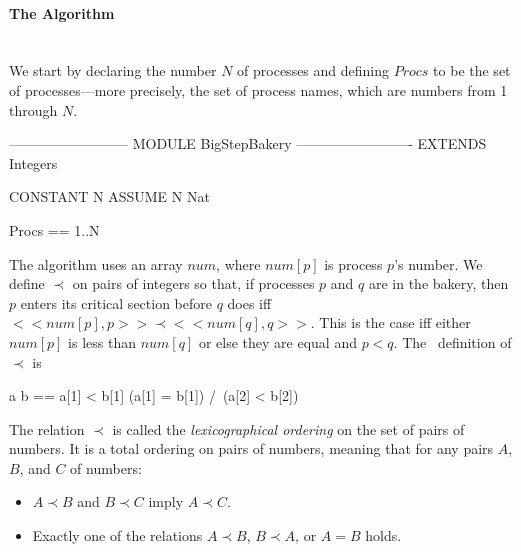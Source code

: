 \documentclass[fleqn,leqno]{article}
\begin{document}
\paragraph{The Algorithm}\mbox{}\\
We start by declaring the number $N$ of processes and defining $Procs$
to be the set of processes---more precisely, the set of process names,
which are numbers from 1 through $N$.
\begin{display}
\begin{notla}
-------------------------- MODULE BigStepBakery -------------------------
EXTENDS Integers

CONSTANT N
ASSUME N \in Nat

Procs == 1..N
\end{notla}
\begin{tlatex}
\@x{}\moduleLeftDash{}\moduleRightDash\@xx{}%
%
\@pvspace{8.0pt}%
%
%
\@pvspace{8.0pt}%
%
\end{tlatex}
\end{display}
The algorithm uses an array $num$, where $num[p]$ is process $p$'s
number.  We define $\prec$ on pairs of integers so that, if processes
$p$ and $q$ are in the bakery, then $p$ enters its critical section
before $q$ does iff $<<num[p],p>> \prec <<num[q], q>>$.  This is the
case iff either $num[p]$ is less than $num[q]$ or else they are equal
and $p<q$.  The \tlaplus\ definition of $\prec$ is
\begin{display}
\begin{notla}
a \prec b == \/ a[1] < b[1]
             \/ (a[1] = b[1]) /\ (a[2] < b[2])
\end{notla}
\begin{tlatex}
%
\end{tlatex}
\end{display}
The relation $\prec$ is called the \emph{lexicographical 
ordering} on the
set of pairs of numbers.  It is a total ordering on pairs of numbers,
meaning that for any pairs $A$, $B$, and $C$ of numbers:
\begin{itemize}
\item $A \prec B$ and $B \prec C$ imply $A \prec C$.

\item Exactly one of the relations $A \prec B$, $B \prec A$, or
$A = B$ holds.
\end{itemize}
\end{document}
